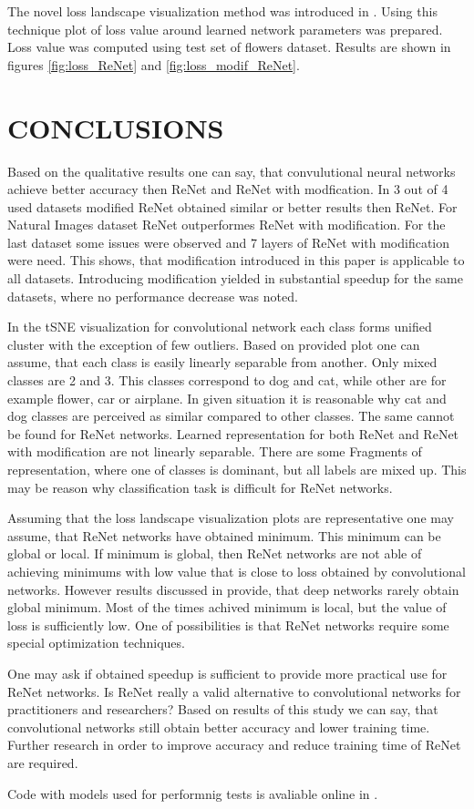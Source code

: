 \documentclass[a4paper, 10 pt, journal]{ieeeconf}
\begin{document}
The novel loss landscape visualization method was introduced in \cite{DBLP:journals/corr/abs-1712-09913}. Using this technique plot of loss value around learned network parameters was prepared. Loss value was computed using test set of flowers dataset. Results are shown in figures \ref{fig:loss_ReNet} and \ref{fig:loss_modif_ReNet}.

\section{CONCLUSIONS}

Based on the qualitative results one can say, that convulutional neural networks achieve better accuracy then ReNet and ReNet with modfication. In 3 out of 4 used datasets modified ReNet obtained similar or better results then ReNet. For Natural Images dataset ReNet outperformes ReNet with modification. For the last dataset some issues were observed and 7 layers of ReNet with modification were need. This shows, that modification introduced in this paper is applicable to all datasets. Introducing modification yielded in substantial speedup for the same datasets, where no performance decrease was noted.

In the tSNE visualization for convolutional network each class forms unified cluster with the exception of few outliers. Based on provided plot one can assume, that each class is easily linearly separable from another. Only mixed classes are 2 and 3. This classes correspond to dog and cat, while other are for example flower, car or airplane. In given situation it is reasonable why cat and dog classes are perceived as similar compared to other classes. The same cannot be found for ReNet networks. Learned representation for both ReNet and ReNet with modification are not linearly separable. There are some Fragments of representation, where one of classes is dominant, but all labels are mixed up. This may be reason why classification task is difficult for ReNet networks.

Assuming that the loss landscape visualization plots are representative one may assume, that ReNet networks have obtained minimum. This minimum can be global or local. If minimum is global, then ReNet networks are not able of achieving minimums with low value that is close to loss obtained by convolutional networks. However results discussed in \cite{Goodfellow-et-al-2016} provide, that deep networks rarely obtain global minimum. Most of the times achived minimum is local, but the value of loss is sufficiently low. One of possibilities is that ReNet networks require some special optimization techniques.

One may ask if obtained speedup is sufficient to provide more practical use for ReNet networks. Is ReNet really a valid alternative to convolutional networks for practitioners and researchers? Based on results of this study we can say, that convolutional networks still obtain better accuracy and lower training time. Further research in order to improve accuracy and reduce training time of ReNet are required.

Code with models used for performnig tests is avaliable online in \cite{repo}.




\end{document}

